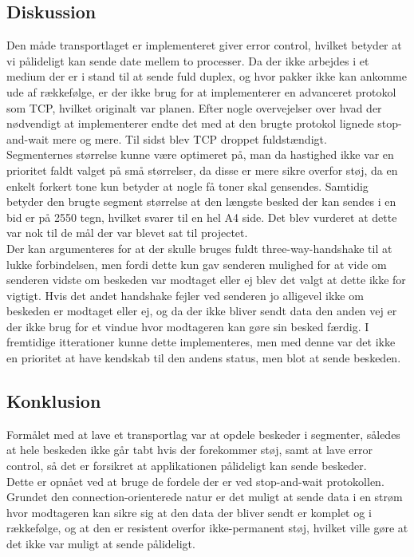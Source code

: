 \subsection{Diskussion}

Den måde transportlaget er implementeret giver error control, hvilket betyder at vi pålideligt kan sende date mellem to processer. Da der ikke arbejdes i et medium der er i stand til at sende fuld duplex, og hvor pakker ikke kan ankomme ude af rækkefølge, er der ikke brug for at implementerer en advanceret protokol som TCP, hvilket originalt var planen. Efter nogle overvejelser over hvad der nødvendigt at implementerer endte det med at den brugte protokol lignede stop-and-wait mere og mere. Til sidst blev TCP droppet fuldstændigt.
\\
Segmenternes størrelse kunne være optimeret på, man da hastighed ikke var en prioritet faldt valget på små størrelser, da disse er mere sikre overfor støj, da en enkelt forkert tone kun betyder at nogle få toner skal gensendes. Samtidig betyder den brugte segment størrelse at den længste besked der kan sendes i en bid er på 2550 tegn, hvilket svarer til en hel A4 side. Det blev vurderet at dette var nok til de mål der var blevet sat til projectet.
\\
Der kan argumenteres for at der skulle bruges fuldt three-way-handshake til at lukke forbindelsen, men fordi dette kun gav senderen mulighed for at vide om senderen vidste om beskeden var modtaget eller ej blev det valgt at dette ikke for vigtigt. Hvis det andet handshake fejler ved senderen jo alligevel ikke om beskeden er modtaget eller ej, og da der ikke bliver sendt data den anden vej er der ikke brug for et vindue hvor modtageren kan gøre sin besked færdig. I fremtidige itterationer kunne dette implementeres, men med denne var det ikke en prioritet at have kendskab til den andens status, men blot at sende beskeden.


\subsection{Konklusion}

Formålet med at lave et transportlag var at opdele beskeder i segmenter, således at hele beskeden ikke går tabt hvis der forekommer støj, samt at lave error control, så det er forsikret at applikationen pålideligt kan sende beskeder.
\\
Dette er opnået ved at bruge de fordele der er ved stop-and-wait protokollen. Grundet den connection-orienterede natur er det muligt at sende data i en strøm hvor modtageren kan sikre sig at den data der bliver sendt er komplet og i rækkefølge, og at den er resistent overfor ikke-permanent støj, hvilket ville gøre at det ikke var muligt at sende pålideligt.











